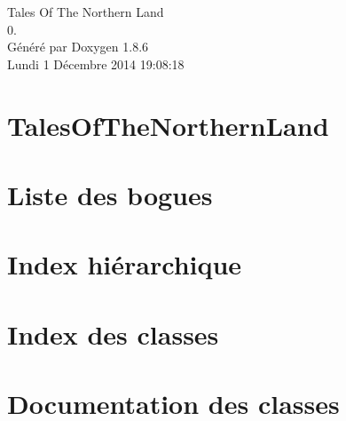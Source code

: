\documentclass[twoside]{book}
\newcommand{\clearemptydoublepage}{%
  \newpage{\pagestyle{empty}\cleardoublepage}%
}
\begin{document}
\hypersetup{pageanchor=false}
\begin{titlepage}
\vspace*{7cm}
\begin{center}%
{\Large Tales Of The Northern Land \\[1ex]\large 0. }\\
\vspace*{1cm}
{\large Généré par Doxygen 1.8.6}\\
\vspace*{0.5cm}
{\small Lundi 1 Décembre 2014 19:08:18}\\
\end{center}
\end{titlepage}
\clearemptydoublepage
\tableofcontents
\clearemptydoublepage
{}
\hypersetup{pageanchor=true}

\chapter{Tales\-Of\-The\-Northern\-Land}
\label{md_README}
\hypertarget{md_README}{}

\chapter{Liste des bogues}
\label{bug}
\hypertarget{bug}{}

\chapter{Index hiérarchique}

\chapter{Index des classes}

\chapter{Documentation des classes}





























\newpage
{}
{}
\printindex
\end{document}
